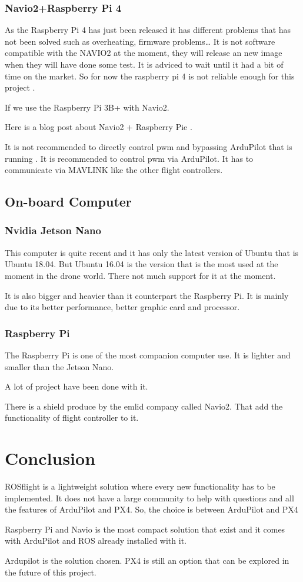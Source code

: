 \subsubsection{Navio2+Raspberry Pi 4}
As the Raspberry Pi 4 has just been released it has different problems that has not been solved such as overheating, firmware problems… It is not software compatible with the NAVIO2 at the moment, they will release an new image when they will have done some test. It is adviced to wait until it had a bit of time on the market. So for now the raspberry pi 4 is not reliable enough for this project \cite{ardupilot_rpi_compatibility}.

If we use the Raspberry Pi 3B+ with Navio2.

Here is a blog post about Navio2 + Raspberry Pie \cite{dojofordrones_rpi_drone}.

It is not recommended to directly control pwm and bypassing ArduPilot that is running \cite{emlid_servo_control}. It is recommended to control pwm via ArduPilot. It has to communicate via MAVLINK like the other flight controllers.

\subsection{On-board Computer}
\subsubsection{Nvidia Jetson Nano}
This computer is quite recent and it has only the latest version of Ubuntu that is Ubuntu 18.04.
But Ubuntu 16.04 is the version that is the most used at the moment in the drone world.
There not much support for it at the moment.

It is also bigger and heavier than it counterpart the Raspberry Pi. It is mainly due to its better performance, better graphic card and processor.

\subsubsection{Raspberry Pi}
The Raspberry Pi is one of the most companion computer use. It is lighter and smaller than the Jetson Nano.

A lot of project have been done with it.

There is a shield produce by the emlid company called Navio2. That add the functionality of flight controller to it.

\section{Conclusion}
ROSflight is a lightweight solution where every new functionality has to be implemented.
It does not have a large community to help with questions and all the features of ArduPilot and PX4. So, the choice is between ArduPilot and PX4

Raspberry Pi and Navio is the most compact solution that exist and it comes with ArduPilot and ROS already installed with it.

Ardupilot is the solution chosen. PX4 is still an option that can be explored in the future of this project.

